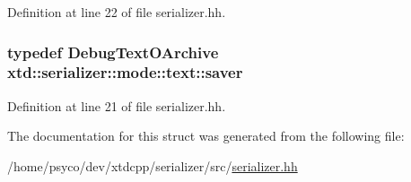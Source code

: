 Definition at line 22 of file serializer.\+hh.

\subsubsection[{\texorpdfstring{saver}{saver}}]{\setlength{\rightskip}{0pt plus 5cm}typedef {\bf Debug\+Text\+O\+Archive} {\bf xtd\+::serializer\+::mode\+::text\+::saver}}\hypertarget{structxtd_1_1serializer_1_1mode_1_1text_a8be416039df8bbed799423bb996811a8}{}\label{structxtd_1_1serializer_1_1mode_1_1text_a8be416039df8bbed799423bb996811a8}


Definition at line 21 of file serializer.\+hh.



The documentation for this struct was generated from the following file\+:\begin{DoxyCompactItemize}
\item 
/home/psyco/dev/xtdcpp/serializer/src/\hyperlink{serializer_8hh}{serializer.\+hh}\end{DoxyCompactItemize}
